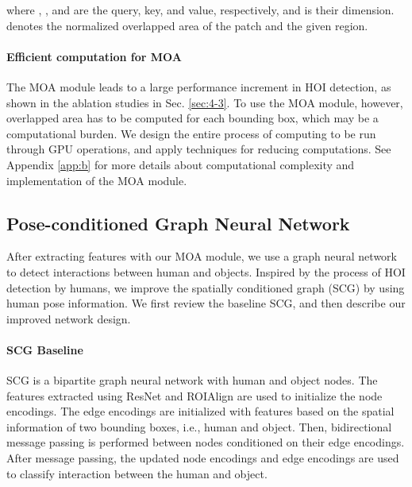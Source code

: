 \documentclass[10pt,twocolumn,letterpaper]{article}
\begin{document}
where , , and  are the query, key, and value, respectively, and  is their dimension.  
denotes the normalized overlapped area of the patch and the given region.


\paragraph {Efficient computation for MOA}
The MOA module leads to a large performance increment in HOI detection, as shown in the ablation studies in Sec. \ref{sec:4-3}. To use the MOA module, however, overlapped area  has to be computed for each bounding box, which may be a computational burden. We design the entire process of computing  to be run through GPU operations, and apply techniques for reducing computations. See Appendix \ref{app:b} for more details about computational complexity and implementation of the MOA module.  





 
\subsection{Pose-conditioned Graph Neural Network}
\label{sec:3-2}
After extracting features with our MOA module, we use a graph neural network to detect interactions between human and objects. Inspired by the process of HOI detection by humans, we improve the spatially conditioned graph (SCG) \cite{zhang2021spatially} by using human pose information. We first review the baseline SCG, and then describe our improved network design.

\paragraph {SCG Baseline}
SCG is a bipartite graph neural network with human and object nodes. The features extracted using ResNet and ROIAlign are used to initialize the node encodings. The edge encodings are initialized with features based on the spatial information of two bounding boxes, i.e., human and object. Then, bidirectional message passing is performed between nodes conditioned on their edge encodings. After message passing, the updated node encodings and edge encodings are used to classify interaction between the human and object. 
\end{document}
